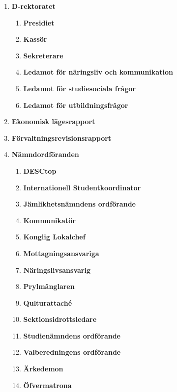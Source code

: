 \documentclass{dagordning}
\begin{document}
  \begin{enumerate}
    \item \textbf{D-rektoratet}
      \begin{enumerate}
         \item \textbf{Presidiet}
         \item \textbf{Kassör}
         \item \textbf{Sekreterare}
         \item \textbf{Ledamot för näringsliv och kommunikation}
         \item \textbf{Ledamot för studiesociala frågor}
         \item \textbf{Ledamot för utbildningsfrågor}
      \end{enumerate}
    \item \textbf{Ekonomisk lägesrapport}
    \item \textbf{Förvaltningsrevisionsrapport}
    \item \textbf{Nämndordföranden}
           \begin{enumerate}
        \item \textbf{DESCtop}
        \item \textbf{Internationell Studentkoordinator}
        \item \textbf{Jämlikhetsnämndens ordförande}
        \item \textbf{Kommunikatör}
        \item \textbf{Konglig Lokalchef}
        \item \textbf{Mottagningsansvariga}
        \item \textbf{Näringslivsansvarig}
        \item \textbf{Prylmånglaren}
        \item \textbf{Qulturattaché}
        \item \textbf{Sektionsidrottsledare}
        \item \textbf{Studienämndens ordförande}
        \item \textbf{Valberedningens ordförande} 
        \item \textbf{Ärkedemon}
        \item \textbf{Öfvermatrona}
      \end{enumerate}
    

\end{enumerate}
\end{document}

